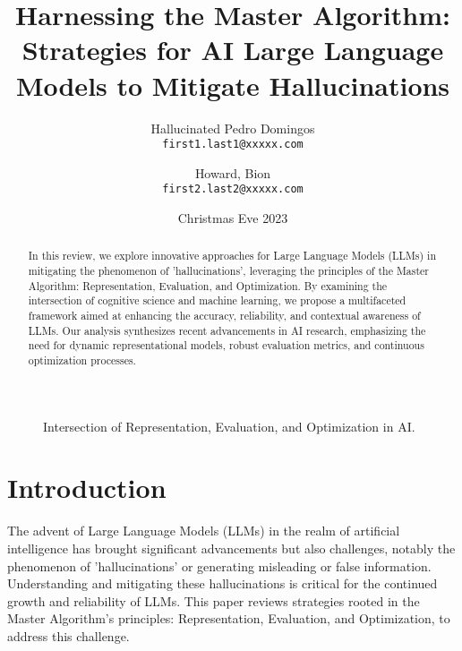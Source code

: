 \documentclass{article}
\title{Harnessing the Master Algorithm: Strategies for AI Large Language Models to Mitigate Hallucinations}
\author{
  Hallucinated Pedro Domingos\\
  \texttt{first1.last1@xxxxx.com}
  \and
  Howard, Bion\\
  \texttt{first2.last2@xxxxx.com}
}
\date{Christmas Eve 2023}
\begin{document}
\maketitle

\begin{figure}[h]
\centering
{}
\caption{Intersection of Representation, Evaluation, and Optimization in AI.}
\label{fig:master-algorithm-triangle}
\end{figure}

\begin{abstract}
In this review, we explore innovative approaches for Large Language Models (LLMs) in mitigating the phenomenon of 'hallucinations', leveraging the principles of the Master Algorithm: Representation, Evaluation, and Optimization. By examining the intersection of cognitive science and machine learning, we propose a multifaceted framework aimed at enhancing the accuracy, reliability, and contextual awareness of LLMs. Our analysis synthesizes recent advancements in AI research, emphasizing the need for dynamic representational models, robust evaluation metrics, and continuous optimization processes.
\end{abstract}

\newpage

\tableofcontents

\newpage

\section{Introduction}
The advent of Large Language Models (LLMs) in the realm of artificial intelligence has brought significant advancements but also challenges, notably the phenomenon of 'hallucinations' or generating misleading or false information. Understanding and mitigating these hallucinations is critical for the continued growth and reliability of LLMs. This paper reviews strategies rooted in the Master Algorithm's principles: Representation, Evaluation, and Optimization, to address this challenge.
\end{document}
